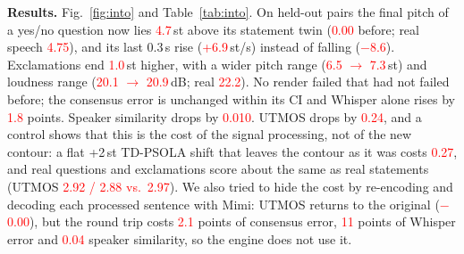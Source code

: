 \documentclass[conference]{IEEEtran}
\newcommand{\RES}[1]{\textcolor{red}{#1}}
\begin{document}
\textbf{Results.} Fig.~\ref{fig:into} and Table~\ref{tab:into}. On held-out pairs the final pitch of a
yes/no question now lies \RES{4.7}\,st above its statement twin (\RES{0.00} before; real speech
\RES{4.75}), and its last 0.3\,s rise (\RES{+6.9}\,st/s) instead of falling (\RES{$-$8.6}). Exclamations end
\RES{1.0}\,st higher, with a wider pitch range (\RES{6.5 $\to$ 7.3}\,st) and loudness range
(\RES{20.1 $\to$ 20.9}\,dB; real \RES{22.2}). No render failed that had not failed before; the consensus
error is unchanged within its CI and Whisper alone rises by \RES{1.8} points. Speaker similarity drops by
\RES{0.010}. UTMOS drops by \RES{0.24}, and a control shows that this is the cost of the signal processing,
not of the new contour: a flat +2\,st TD-PSOLA shift that leaves the contour as it was costs \RES{0.27}, and
real questions and exclamations score about the same as real statements (UTMOS \RES{2.92 / 2.88 vs.\ 2.97}).
We also tried to hide the cost by re-encoding and decoding each processed sentence with Mimi: UTMOS returns
to the original (\RES{$-$0.00}), but the round trip costs \RES{2.1} points of consensus error, \RES{11}
points of Whisper error and \RES{0.04} speaker similarity, so the engine does not use it.
\end{document}
